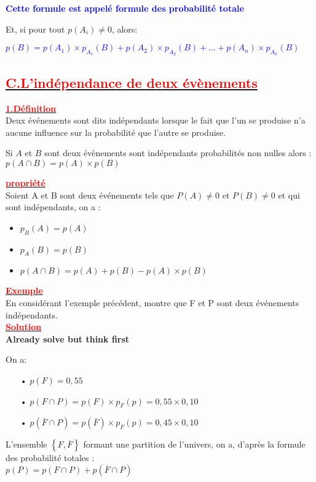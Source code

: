 \documentclass[12pt,a4paper]{article}
\newcounter{exemple} %
\begin{document}
\textbf{\textcolor{blue}{Cette formule est appelé formule des probabilité totale}}

Et, si pour tout $p(A_{i}) \neq 0$, alors:

\textcolor{blue}{$p(B)=p(A_{1})\times p_{A_{1}}(B)+p(A_{2})\times p_{A_{2}}(B)+...+p(A_{n})\times p_{A_{n}}(B)$}
\subsection*{\underline{\textbf{\textcolor{red}{C.L'indépendance de deux évènements}}}}
\underline{\textbf{\textcolor{red}{1.Définition}}}\\
Deux événements sont dits indépendants lorsque le fait que l’un se produise n’a aucune influence sur la probabilité que l’autre se produise.

Si $A$ et $B$ sont deux évènements sont indépendants probabilités non nulles alors :
$p(A\cap B)=p(A)\times p(B)$

\underline{\textbf{\textcolor{red}{propriété}}}\\

Soient A et B sont deux événements tels que $P(A) \neq 0 $ et $P(B) \neq 0 $ et qui sont indépendants, on a :

\begin{itemize}
\item $p_{B}(A)=p(A)$
\item $p_{A}(B)=p(B)$
\item $p(A\cap B)=p(A) + p(B)-p(A)\times p(B)$
\end{itemize}

\underline{\textbf{\textcolor{red}{Exemple}}}\\
En considérant l'exemple précédent, montre que F et P sont deux événements indépendants.\\
\underline{\textbf{\textcolor{red}{Solution}}}\\
\textbf{Already solve but think first}

On a:
\begin{itemize}
\item[•]$p(F)=0,55$
\item[•] $p(F\cap P)=p(F)\times p_{F}(p)=0,55\times 0,10 $
\item[•] $p(\overline{F}\cap P)=p(\overline{F})\times p_{\overline{F}}(p)=0,45\times 0,10$
\end{itemize}
L'ensemble $\left\lbrace F, \overline{F} \right\rbrace $ formant une partition de l'univers, on a, d'après la formule des probabilité totales :\\
$p(P)=p(F\cap P)+p(\overline{F}\cap P)$
\end{document}
